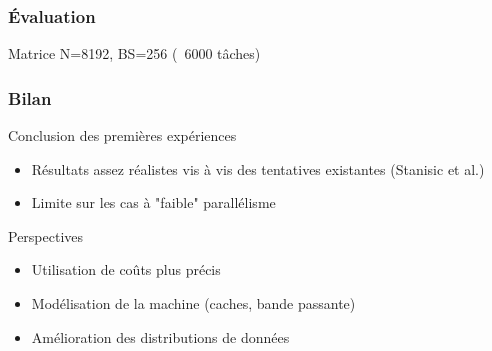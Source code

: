 \documentclass[xcolor={usenames,dvipsnames,svgnames,table}, aspectratio=43]{beamer}
\begin{document}
\begin{frame}
  \frametitle{Évaluation}
  Matrice N=8192, BS=256 (~6000 tâches)
  \begin{figure}
  \end{figure}


\end{frame}



\begin{frame}
  \frametitle{Bilan}

  \begin{block}{Conclusion des premières expériences}
    \begin{itemize}
      \item Résultats assez réalistes vis à vis des tentatives existantes (Stanisic et al.)
      \item Limite sur les cas à "faible" parallélisme
    \end{itemize}
  \end{block}
  \begin{block}{Perspectives}
    \begin{itemize}
      \item Utilisation de coûts plus précis
      \item Modélisation de la machine (caches, bande passante)
      \item Amélioration des distributions de données
    \end{itemize}
  \end{block}
\end{frame}
\end{document}
